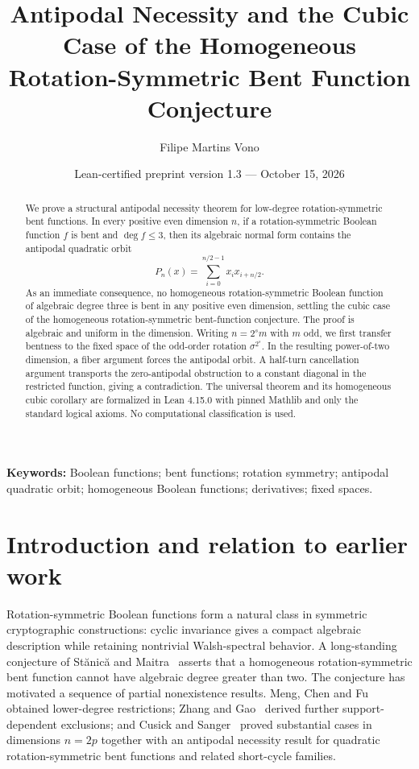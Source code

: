 \documentclass[11pt,a4paper]{article}
\title{Antipodal Necessity and the Cubic Case of the Homogeneous Rotation-Symmetric Bent Function Conjecture}
\author{Filipe Martins Vono}
\date{Lean-certified preprint version 1.3 --- October 15, 2026}
\theoremstyle{remark}
\theoremstyle{plain}
\begin{document}
\maketitle
\begin{abstract}
We prove a structural antipodal necessity theorem for low-degree rotation-symmetric bent functions. In every positive even dimension $n$, if a rotation-symmetric Boolean function $f$ is bent and $\deg f\le3$, then its algebraic normal form contains the antipodal quadratic orbit
\[
P_n(x)=\sum_{i=0}^{n/2-1}x_i x_{i+n/2}.
\]
As an immediate consequence, no homogeneous rotation-symmetric Boolean function of algebraic degree three is bent in any positive even dimension, settling the cubic case of the homogeneous rotation-symmetric bent-function conjecture. The proof is algebraic and uniform in the dimension. Writing $n=2^s m$ with $m$ odd, we first transfer bentness to the fixed space of the odd-order rotation $\sigma^{2^s}$. In the resulting power-of-two dimension, a fiber argument forces the antipodal orbit. A half-turn cancellation argument transports the zero-antipodal obstruction to a constant diagonal in the restricted function, giving a contradiction. The universal theorem and its homogeneous cubic corollary are formalized in Lean 4.15.0 with pinned Mathlib and only the standard logical axioms. No computational classification is used.
\end{abstract}
\noindent\textbf{Keywords:} Boolean functions; bent functions; rotation symmetry; antipodal quadratic orbit; homogeneous Boolean functions; derivatives; fixed spaces.

\section{Introduction and relation to earlier work}
Rotation-symmetric Boolean functions form a natural class in symmetric cryptographic constructions: cyclic invariance gives a compact algebraic description while retaining nontrivial Walsh-spectral behavior. A long-standing conjecture of St\u{a}nic\u{a} and Maitra~\cite{stanica} asserts that a homogeneous rotation-symmetric bent function cannot have algebraic degree greater than two. The conjecture has motivated a sequence of partial nonexistence results. Meng, Chen and Fu~\cite{meng} obtained lower-degree restrictions; Zhang and Gao~\cite{zhang} derived further support-dependent exclusions; and Cusick and Sanger~\cite{cusick} proved substantial cases in dimensions $n=2p$ together with an antipodal necessity result for quadratic rotation-symmetric bent functions and related short-cycle families.
\end{document}
